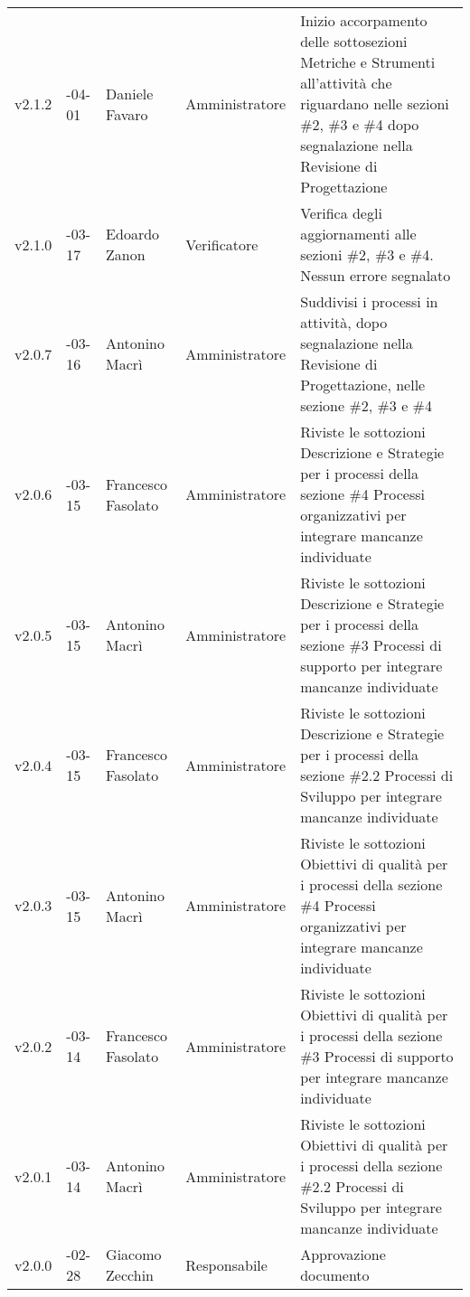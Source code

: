 \begin{longtable} { >{\centering}p{1.4cm} >{\centering}p{2cm} >{\centering}p{2.3cm} >{\centering}p{2.7cm} p{5.5cm} }
\addlinespace[0.4em]
\midrule
\addlinespace[0.4em]
v2.1.2 & 2017-04-01 & Daniele Favaro & Amministratore & Inizio accorpamento delle sottosezioni  Metriche e Strumenti all'attività che riguardano nelle sezioni  \#2, \#3 e \#4 dopo segnalazione nella Revisione di Progettazione \\ 
\addlinespace[0.4em]
\midrule
\addlinespace[0.4em]
v2.1.0 & 2017-03-17 & Edoardo Zanon & Verificatore & Verifica degli aggiornamenti alle sezioni \#2, \#3 e \#4. Nessun errore segnalato\\ 
\addlinespace[0.4em]
\midrule
\addlinespace[0.4em]
v2.0.7 & 2017-03-16 & Antonino Macrì & Amministratore & Suddivisi i processi in attività, dopo segnalazione nella Revisione di Progettazione, nelle sezione \#2, \#3 e \#4 \\ 
\addlinespace[0.4em]
\midrule
\addlinespace[0.4em]
v2.0.6 & 2017-03-15 & Francesco Fasolato & Amministratore & Riviste le sottozioni Descrizione e Strategie per i processi della sezione \#4 Processi organizzativi per integrare mancanze individuate \\ 
\addlinespace[0.4em]
\midrule
\addlinespace[0.4em]
v2.0.5 & 2017-03-15 & Antonino Macrì & Amministratore & Riviste le sottozioni Descrizione e Strategie per i processi della sezione \#3 Processi di supporto per integrare mancanze individuate \\ 
\addlinespace[0.4em]
\midrule
\addlinespace[0.4em]
v2.0.4 & 2017-03-15 & Francesco Fasolato & Amministratore & Riviste le sottozioni Descrizione e Strategie per i processi della sezione \#2.2 Processi di Sviluppo per integrare mancanze individuate \\ 
\addlinespace[0.4em]
\midrule
\addlinespace[0.4em]
v2.0.3 & 2017-03-15 & Antonino Macrì & Amministratore & Riviste le sottozioni Obiettivi di qualità per i processi della sezione \#4 Processi organizzativi per integrare mancanze individuate \\ 
\addlinespace[0.4em]
\midrule
\addlinespace[0.4em]
v2.0.2 & 2017-03-14 & Francesco Fasolato & Amministratore & Riviste le sottozioni Obiettivi di qualità per i processi della sezione \#3 Processi di supporto per integrare mancanze individuate \\ 
\addlinespace[0.4em]
\midrule
\addlinespace[0.4em]
v2.0.1 & 2017-03-14 & Antonino Macrì & Amministratore & Riviste le sottozioni Obiettivi di qualità per i processi della sezione \#2.2 Processi di Sviluppo per integrare mancanze individuate \\ 
\addlinespace[0.4em]
\midrule
\addlinespace[0.4em]
v2.0.0 & 2017-02-28 & Giacomo Zecchin & Responsabile & Approvazione documento\\ 

\end{longtable}
